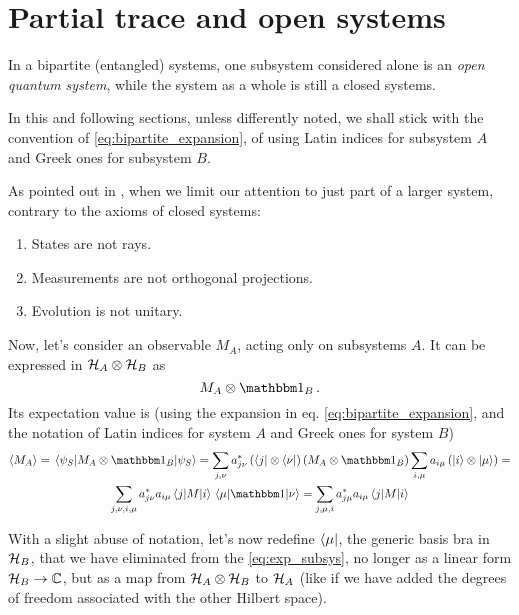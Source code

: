 \section{Partial trace and open systems}
\label{sec:p_tr}

In a bipartite (entangled) systems, one subsystem considered alone is an
\emph{open quantum system},
while the system as a whole is still a closed systems.

In this and following sections, unless differently noted,
we shall stick with the convention of \eqref{eq:bipartite_expansion},
of using
Latin indices for subsystem $A$ and Greek ones for subsystem $B$.

As pointed out in
\cite[\S 2.3.1]{PreskillNotes}, when we limit our attention to
just part of a larger system, contrary to the axioms of closed systems:
\begin{enumerate}
  \item States are not rays.
  \item Measurements are not orthogonal projections.
  \item Evolution is not unitary.
\end{enumerate}

Now, let's consider an observable $M_A$, acting only on subsystems $A$.
It can be expressed in $\mathcal{H}_A \otimes \mathcal{H}_B$ as
\[
  M_A \otimes \idop_B\, .
\]
Its expectation value is
(using the expansion in eq. \ref{eq:bipartite_expansion},
and the notation of Latin indices for system $A$ and Greek ones for system $B$)
\begin{multline}\label{eq:exp_subsys}
  \expval{M_A} = \matrixel{\psi_S}{M_A\otimes\idop_B}{\psi_S} =
  \sum_{j,\nu}a^{*}_{j\nu}\left(\bra{j}\otimes\bra{\nu}\right)\left(M_A\otimes\idop_B\right)\sum_{i,\mu}a_{i\mu}\left(\ket{i}\otimes\ket{\mu}\right) = \\
  \sum_{j,\nu,i,\mu}a^{*}_{j\nu}a_{i\mu}\matrixel{j}{M}{i}\matrixel{\mu}{\idop}{\nu} =
  \sum_{j,\mu,i}a^{*}_{j\mu}a_{i\mu}\matrixel{j}{M}{i}
\end{multline}






With a slight abuse of notation,
let's now redefine
$\bra{\mu}$,
the generic basis bra in $\mathcal{H}_B$,
that we have eliminated from the \eqref{eq:exp_subsys}, 
no longer as a linear form $\mathcal{H}_B \rightarrow \mathbb{C}$,
but as a map from $\mathcal{H}_A\otimes\mathcal{H}_B$ to $\mathcal{H}_A$
(like if we have added the degrees of freedom associated
with the other Hilbert space).

